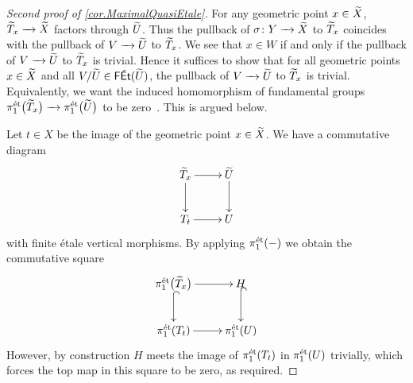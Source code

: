 \documentclass[12pt]{amsart}
\numberwithin{equation}{theorem}
\renewcommand{\:}{\colon}
\newcommand{\piet}{\pi_1^{\textnormal{\'{e}t}}} %
\theoremstyle{theorem}
\begin{document}
\begin{proof} [Second proof of \autoref{cor.MaximalQuasiEtale}]
For any geometric point $x \in \widetilde X$, $\widetilde T_x \xrightarrow{\ \ } \widetilde X$ factors through $\widetilde U$.
Thus the pullback of $\sigma\colon Y \xrightarrow{\ \ } \widetilde X$ to $\widetilde T_x$ coincides with the pullback of $V \xrightarrow{\ \ } \widetilde U$ to $\widetilde T_x$.
We see that $x \in W$ if and only if the pullback of $V \xrightarrow{\ \ } \widetilde U$ to $\widetilde T_x$ is trivial.
Hence it suffices to show that for all geometric points $x \in \widetilde X$ and all $V / \widetilde U \in \textsf{F\'{E}t}(\widetilde U)$, the pullback of $V \xrightarrow{\ \ } \widetilde U$ to $\widetilde T_x$ is trivial.
Equivalently, we want the induced homomorphism of fundamental groups $\piet \bigl( \tld T_x \bigr) \to \piet \bigl( \tld U \bigr)$ to be zero~\cite[5.2.3]{MurreLecturesFundamentalGroups}. %
This is argued below.

Let $t \in X$ be the image of the geometric point $x \in \widetilde X$. We have a commutative diagram
\[
\xymatrix{
\tld T_x \ar[r] \ar[d] & \tld U \ar[d] \\
T_t \ar[r] & U
}
\]
with finite \'etale vertical morphisms.
By applying $\piet(-)$ we obtain the commutative square
\[
\xymatrix{
\pi_1^{\et}\bigl(\tld T_x\bigr) \ar@{^{(}->}[d] \ar[r] & H \ar@{^{(}->}[d] \\
\pi_1^{\et}(T_t) \ar[r] & \pi_1^{\et}(U)
}
\]
However, by construction $H$ meets the image of $\pi_1^{\textnormal{{\'e}t}}(T_t)$ in $\pi_1^{\textnormal{{\'e}t}}(U)$ trivially, which forces the top map in this square to be zero, as required.
\end{proof}
\end{document}
